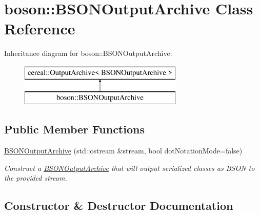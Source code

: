 \hypertarget{classboson_1_1BSONOutputArchive}{}\section{boson\+:\+:B\+S\+O\+N\+Output\+Archive Class Reference}
\label{classboson_1_1BSONOutputArchive}
Inheritance diagram for boson\+:\+:B\+S\+O\+N\+Output\+Archive\+:\begin{figure}[H]
\begin{center}
\leavevmode
\includegraphics[height=2.000000cm]{classboson_1_1BSONOutputArchive}
\end{center}
\end{figure}
\subsection*{Public Member Functions}
\begin{DoxyCompactItemize}
\item 
\hyperlink{classboson_1_1BSONOutputArchive_a5d80167bedb53885fcad535febbb3139}{B\+S\+O\+N\+Output\+Archive} (std\+::ostream \&stream, bool dot\+Notation\+Mode=false)
\begin{DoxyCompactList}\small\item\em Construct a \hyperlink{classboson_1_1BSONOutputArchive}{B\+S\+O\+N\+Output\+Archive} that will output serialized classes as B\+S\+ON to the provided stream. \end{DoxyCompactList}\end{DoxyCompactItemize}


\subsection{Constructor \& Destructor Documentation}
